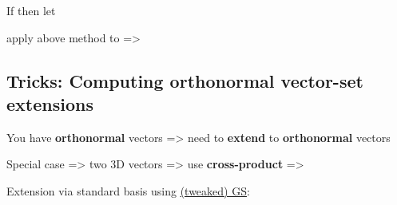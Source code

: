 If  then let 
\begin{itemize}

      \vItem
            apply above method to  =\textgreater{}
      \vItem
\end{itemize}



\subsection*{Tricks: Computing orthonormal vector-set extensions}

You have \textbf{orthonormal} vectors
=\textgreater{} need to \textbf{extend} to \textbf{orthonormal}
vectors

Special case =\textgreater{} two 3D vectors =\textgreater{} use
\textbf{cross-product} =\textgreater{} 

\hSep %

Extension via standard basis
using \ul{\textbar(tweaked) GS}:

